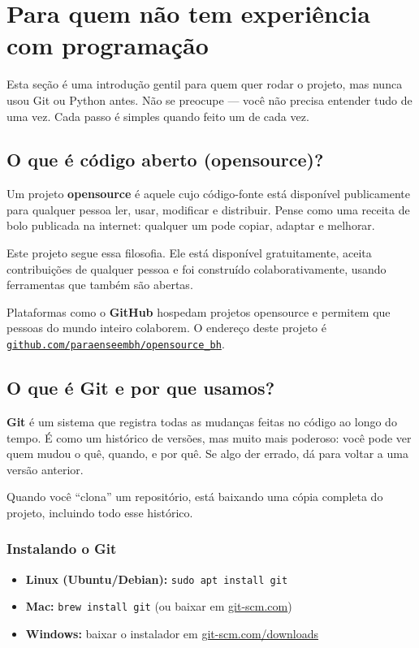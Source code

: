 \documentclass[12pt,a4paper]{article}
\begin{document}
\section{Para quem não tem experiência com programação}

Esta seção é uma introdução gentil para quem quer rodar o projeto, mas nunca usou Git ou Python antes. Não se preocupe --- você não precisa entender tudo de uma vez. Cada passo é simples quando feito um de cada vez.

\subsection{O que é código aberto (opensource)?}

Um projeto \textbf{opensource} é aquele cujo código-fonte está disponível publicamente para qualquer pessoa ler, usar, modificar e distribuir. Pense como uma receita de bolo publicada na internet: qualquer um pode copiar, adaptar e melhorar.

Este projeto segue essa filosofia. Ele está disponível gratuitamente, aceita contribuições de qualquer pessoa e foi construído colaborativamente, usando ferramentas que também são abertas.

Plataformas como o \textbf{GitHub} hospedam projetos opensource e permitem que pessoas do mundo inteiro colaborem. O endereço deste projeto é \href{https://github.com/paraenseembh/opensource_bh}{\texttt{github.com/paraenseembh/opensource\_bh}}.

\subsection{O que é Git e por que usamos?}

\textbf{Git} é um sistema que registra todas as mudanças feitas no código ao longo do tempo. É como um histórico de versões, mas muito mais poderoso: você pode ver quem mudou o quê, quando, e por quê. Se algo der errado, dá para voltar a uma versão anterior.

Quando você ``clona'' um repositório, está baixando uma cópia completa do projeto, incluindo todo esse histórico.

\subsubsection{Instalando o Git}

\begin{itemize}
  \item \textbf{Linux (Ubuntu/Debian):} \lstinline|sudo apt install git|
  \item \textbf{Mac:} \lstinline|brew install git| (ou baixar em \href{https://git-scm.com}{git-scm.com})
  \item \textbf{Windows:} baixar o instalador em \href{https://git-scm.com/downloads}{git-scm.com/downloads}
\end{itemize}
\end{document}
